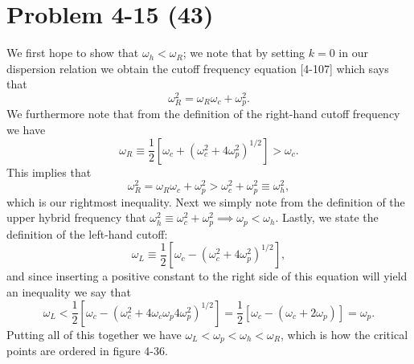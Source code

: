 \section*{Problem 4-15 (43)}
\label{sec:4-15}
We first hope to show that \(\omega_h < \omega_R \); we note that by setting \(k=0\) in our dispersion relation we obtain the cutoff frequency equation [4-107] which says that
\begin{equation*}
	\omega_R^2 = \omega_R\omega_c + \omega_p^2.
\end{equation*}
We furthermore note that from the definition of the right-hand cutoff frequency we have
\begin{equation*}
	\omega_R \equiv \frac{1}{2}\left[\omega_c + (\omega_c^2 + 4\omega_p^2)^{1/2} \right] > \omega_c.
\end{equation*}
This implies that 
\begin{equation*}
	\omega^2_R = \omega_R\omega_c + \omega_p^2 > \omega_c^2 + \omega^2_p \equiv \omega_h^2,
\end{equation*}
which is our rightmost inequality. Next we simply note from the definition of the upper hybrid frequency that \(\omega^2_h \equiv \omega^2_c + \omega^2_p \implies \omega_p < \omega_h \). Lastly, we state the definition of the left-hand cutoff:
\begin{equation*}
	\omega_L \equiv \frac{1}{2}\left[\omega_c - (\omega_c^2 + 4\omega_p^2)^{1/2} \right],
\end{equation*}
and since inserting a positive constant to the right side of this equation will yield an inequality we say that
\begin{equation*}
\omega_L < \frac{1}{2}\left[\omega_c - (\omega_c^2 +4\omega_c\omega_p 4\omega_p^2)^{1/2} \right] = \frac{1}{2}\left[\omega_c - (\omega_c + 2\omega_p) \right] = \omega_p.
\end{equation*}
Putting all of this together we have \(\omega_L < \omega_p < \omega_h < \omega_R \), which is how the critical points are ordered in figure 4-36.


